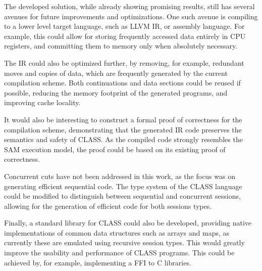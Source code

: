 The developed solution, while already showing promising results, still has several avenues for future improvements and optimizations. One such avenue is compiling to a lower level target language, such as LLVM IR, or assembly language. For example, this could allow for storing frequently accessed data entirely in CPU registers, and committing them to memory only when absolutely necessary.

The \ac{IR} could also be optimized further, by removing, for example, redundant moves and copies of data, which are frequently generated by the current compilation scheme. Both continuations and data sections could be reused if possible, reducing the memory footprint of the generated programs, and improving cache locality.

It would also be interesting to construct a formal proof of correctness for the compilation scheme, demonstrating that the generated \ac{IR} code preserves the semantics and safety of \ac{CLASS}. As the compiled code strongly resembles the \ac{SAM} execution model, the proof could be based on its existing proof of correctness.

Concurrent cuts have not been addressed in this work, as the focus was on generating efficient sequential code. The type system of the \ac{CLASS} language could be modified to distinguish between sequential and concurrent sessions, allowing for the generation of efficient code for both sessions types.

Finally, a standard library for \ac{CLASS} could also be developed, providing native implementations of common data structures such as arrays and maps, as currently these are emulated using recursive session types. This would greatly improve the usability and performance of \ac{CLASS} programs. This could be achieved by, for example, implementing a \ac{FFI} to C libraries.
